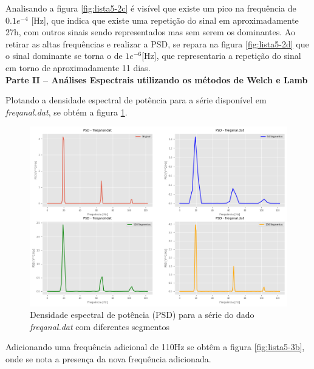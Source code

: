 \documentclass[12pt,a4paper,portuguese]{article}
\begin{document}
	Analisando a figura \ref{fig:lista5-2c} é visível que existe um pico na frequência de $0.1e^{-4}$ [Hz], que indica que existe uma repetição do sinal em aproximadamente 27h, com outros sinais sendo representados mas sem serem os dominantes. Ao retirar as altas frequências e realizar a PSD, se repara na figura \ref{fig:lista5-2d} que o sinal dominante se torna o de $1e^{-6}$[Hz], que representaria a repetição do sinal em torno de aproximadamente 11 dias. \\
	
	
	
\textbf{Parte II – Análises Espectrais utilizando os métodos de Welch e Lamb}

Plotando a densidade espectral de potência para a série disponível em \textit{freqanal.dat}, se obtém a figura \ref{fig:lista5-3a}.

	\begin{figure}[H]
	\centering
	\includegraphics[width=1\linewidth]{lista5-3a}
	\caption{Densidade espectral de potência (PSD) para a série do dado \textit{freqanal.dat} com diferentes segmentos }
	\label{fig:lista5-3a}
\end{figure}

Adicionando uma frequência adicional de 110Hz se obtêm a figura  \ref{fig:lista5-3b}, onde se nota a presença da nova frequência adicionada.
\end{document}
